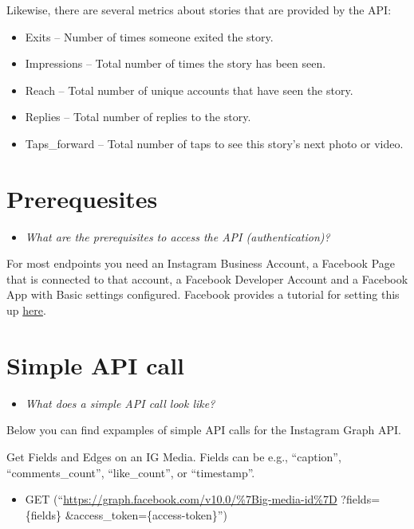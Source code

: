 \documentclass[
]{book}
\providecommand{\tightlist}{%
  \setlength{\itemsep}{0pt}\setlength{\parskip}{0pt}}
\begin{document}
Likewise, there are several metrics about stories that are provided by the API:

\begin{itemize}
\tightlist
\item
  Exits -- Number of times someone exited the story.
\item
  Impressions -- Total number of times the story has been seen.
\item
  Reach -- Total number of unique accounts that have seen the story.
\item
  Replies -- Total number of replies to the story.
\item
  Taps\_forward -- Total number of taps to see this story's next photo or video.
\end{itemize}

\hypertarget{prerequesites-5}{%
\section{Prerequesites}\label{prerequesites-5}}

\begin{itemize}
\tightlist
\item
  \emph{What are the prerequisites to access the API (authentication)? }
\end{itemize}

For most endpoints you need an Instagram Business Account, a Facebook Page that is connected to that account, a Facebook Developer Account and a Facebook App with Basic settings configured. Facebook provides a tutorial for setting this up \href{\%22https://developers.facebook.com/docs/instagram-api/getting-started\%22}{here}.

\hypertarget{simple-api-call-5}{%
\section{Simple API call}\label{simple-api-call-5}}

\begin{itemize}
\tightlist
\item
  \emph{What does a simple API call look like?}
\end{itemize}

Below you can find expamples of simple API calls for the Instagram Graph API.

Get Fields and Edges on an IG Media. Fields can be e.g., ``caption'', ``comments\_count'', ``like\_count'', or ``timestamp''.

\begin{itemize}
\tightlist
\item
  GET (``\url{https://graph.facebook.com/v10.0/\%7Big-media-id\%7D} ?fields=\{fields\} \&access\_token=\{access-token\}'')
\end{itemize}
\end{document}
